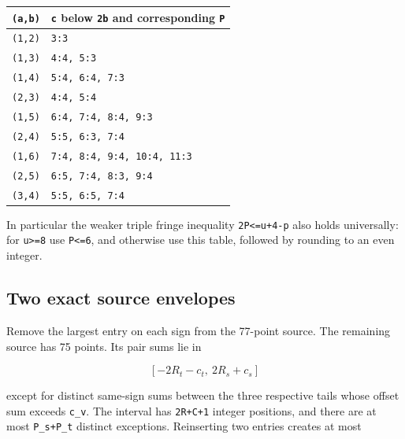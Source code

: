 \documentclass[10pt,a4paper]{article}
\theoremstyle{definition}
\begin{document}
\begin{longtable}[]{@{}ll@{}}
\toprule\noalign{}
\texttt{(a,\allowbreak{}b)} & \texttt{c} below
\texttt{2b} and corresponding
\texttt{P} \\
\midrule\noalign{}
\endhead
\bottomrule\noalign{}
\endlastfoot
\texttt{(1,\allowbreak{}2)} & \texttt{3:3} \\
\texttt{(1,\allowbreak{}3)} & \texttt{4:4,\allowbreak{} 5:3} \\
\texttt{(1,\allowbreak{}4)} &
\texttt{5:4,\allowbreak{} 6:4,\allowbreak{} 7:3} \\
\texttt{(2,\allowbreak{}3)} & \texttt{4:4,\allowbreak{} 5:4} \\
\texttt{(1,\allowbreak{}5)} &
\texttt{6:4,\allowbreak{} 7:4,\allowbreak{} 8:4,\allowbreak{} 9:3} \\
\texttt{(2,\allowbreak{}4)} &
\texttt{5:5,\allowbreak{} 6:3,\allowbreak{} 7:4} \\
\texttt{(1,\allowbreak{}6)} &
\texttt{7:4,\allowbreak{} 8:4,\allowbreak{} 9:4,\allowbreak{} 10:4,\allowbreak{} 11:3} \\
\texttt{(2,\allowbreak{}5)} &
\texttt{6:5,\allowbreak{} 7:4,\allowbreak{} 8:3,\allowbreak{} 9:4} \\
\texttt{(3,\allowbreak{}4)} &
\texttt{5:5,\allowbreak{} 6:5,\allowbreak{} 7:4} \\
\end{longtable}

In particular the weaker triple fringe inequality
\texttt{2P<=\allowbreak{}u+\allowbreak{}4-p} also holds universally: for
\texttt{u>=\allowbreak{}8} use \texttt{P<=\allowbreak{}6},\allowbreak{} and
otherwise use this table,\allowbreak{} followed by rounding to an even integer.

\hypertarget{two-exact-source-envelopes}{%
\subsection{Two exact source
envelopes}\label{two-exact-source-envelopes}}

Remove the largest entry on each sign from the 77-point source. The
remaining source has 75 points. Its pair sums lie in

\[
 [-2R_t-c_t,\allowbreak{}\ 2R_s+\allowbreak{}c_s]
\]

except for distinct same-sign sums between the three respective tails
whose offset sum exceeds \texttt{c\_\allowbreak{}\allowbreak{}v}. The interval
has \texttt{2R+\allowbreak{}C+\allowbreak{}1} integer positions,\allowbreak{} and there are at
most \texttt{P\_\allowbreak{}\allowbreak{}s+\allowbreak{}P\_\allowbreak{}\allowbreak{}t} distinct exceptions.
Reinserting two entries creates at most
\end{document}
